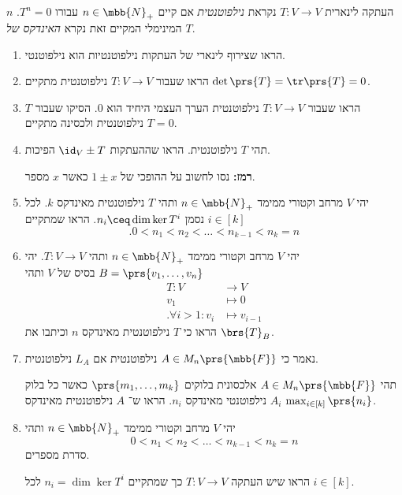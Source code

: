 \documentclass[a4paper,10pt,oneside,openany]{article}
\begin{document}
\begin{exercise}[נילפוטנטיות]
העתקה לינארית
$T \colon V \to V$
נקראת
\emph{נילפוטנטית}
אם קיים
$n \in \mbb{N}_+$
עבורו
$T^n = 0$.
$n$
המינימלי המקיים זאת נקרא
\emph{האינדקס של $T$}.

\begin{enumerate}
\item הראו שצירוף לינארי של העתקות נילפוטנטיות הוא נילפוטנטי.
\item הראו שעבור
$T \colon V \to V$
נילפוטנטית מתקיים
$\det\prs{T} = \tr\prs{T} = 0$.
\item 
הראו שעבור
$T \colon V \to V$
נילפוטנטית הערך העצמי היחיד הוא
$0$.
הסיקו שעבור
$T$
נילפוטנטית ולכסינה מתקיים
$T = 0$.
\item תהי
$T$
נילפוטנטית. הראו שההעתקות
$\id_V \pm T$
הפיכות.

\textbf{רמז:}
נסו לחשוב על ההופכי של $1 \pm x$ כאשר
$x$
מספר.

\item 
יהי
$V$
מרחב וקטורי ממימד
$n \in \mbb{N}_+$
ותהי
$T$
נילפוטנטית מאינדקס
$k$.
לכל
$i \in [k]$
נסמן
$n_i \ceq \dim \ker T^i$.
הראו שמתקיים
\[\text{.} 0 < n_1 < n_2 < \ldots < n_{k-1} < n_k = n\]

\item יהי
$V$
מרחב וקטורי ממימד
$n \in \mbb{N}_+$
ותהי
$T \colon V \to V$.
יהי
$B = \prs{v_1, \ldots, v_n}$
בסיס של
$V$
ותהי
\begin{align*}
T \colon V &\to V \\
v_1 &\mapsto 0 \\
\text{.} \forall i > 1 \colon v_i &\mapsto v_{i-1}
\end{align*}
הראו כי
$T$
נילפוטנטית מאינדקס
$n$
וכיתבו את
$\brs{T}_B$.

\item 
נאמר כי
$A\in M_n\prs{\mbb{F}}$
נילפוטנטית אם
$L_A$
נילפוטנטית.

תהי
$A \in M_n\prs{\mbb{F}}$
אלכסונית בלוקים $\prs{m_1, \ldots, m_k}$
כאשר כל בלוק
$A_i$
נילפוטנטי מאינדקס
$n_i$.
הראו ש־%
$A$
נילפוטנטית מאינדקס
$\max_{i \in [k]} \prs{n_i}$.
\item יהי
$V$
מרחב וקטורי ממימד
$n \in \mbb{N}_+$
ותהי
\[0 < n_1 < n_2 < \ldots < n_{k-1} < n_k = n\]
סדרת מספרים.

הראו שיש העתקה
$T \colon V \to V$
כך שמתקיים
$n_i = \dim \ker T^i$
לכל
$i \in [k]$.
\end{enumerate}
\end{exercise}
\end{document}
